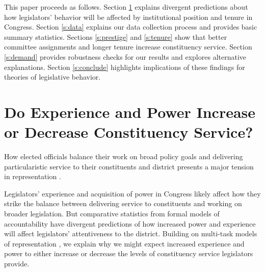 \documentclass[12pt]{article}
\begin{document}
This paper proceeds as follows. Section \ref{s:theory} explains divergent predictions about how legislators' behavior will be affected by institutional position and tenure in Congress. Section \ref{s:data} explains our data collection process and provides basic summary statistics. Sections \ref{s:prestige} and \ref{s:tenure} show that better committee assignments and longer tenure increase constituency service. Section \ref{s:demand} provides robustness checks for our results and explores alternative explanations. Section \ref{s:conclude} highlights implications of these findings for theories of legislative behavior.

\section{Do Experience and Power Increase or Decrease Constituency Service?} \label{s:theory}

How elected officials balance their work on broad policy goals and delivering particularistic service to their constituents and district presents a major tension in representation \citep{AshworthBuenodeMesquita2006}.

Legislators' experience and acquisition of power in Congress likely affect how they strike the balance between delivering service to constituents and working on broader legislation. But comparative statistics from formal models of accountability have divergent predictions of how increased power and experience will affect legislators' attentiveness to the district. Building on multi-task models of representation \citep{AshworthBuenodeMesquita2006, gordon2009advantages}, we explain why we might expect increased experience and power to either increase or decrease the levels of constituency service legislators provide.


\end{document}
